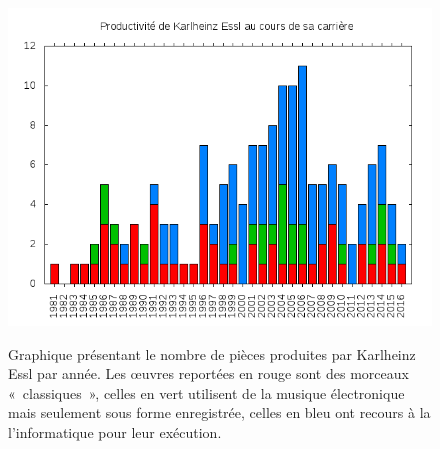 \documentclass[a4paper,12pt]{article}
\newcommand{\guill}[1]{«~#1~»}
\begin{document}
\begin{figure}[h!]
\begin{center}
\includegraphics[width=12cm]{../Divers/plots/ComputerMusic3.png}
\label{productivite}
\caption{\footnotesize Graphique présentant le nombre de pièces produites par Karlheinz Essl par année. Les œuvres reportées en rouge sont des morceaux \guill{classiques}, celles en vert utilisent de la musique électronique mais seulement sous forme enregistrée, celles en bleu ont recours à la l'informatique pour leur exécution.}
\end{center}
\end{figure}
\end{document}
